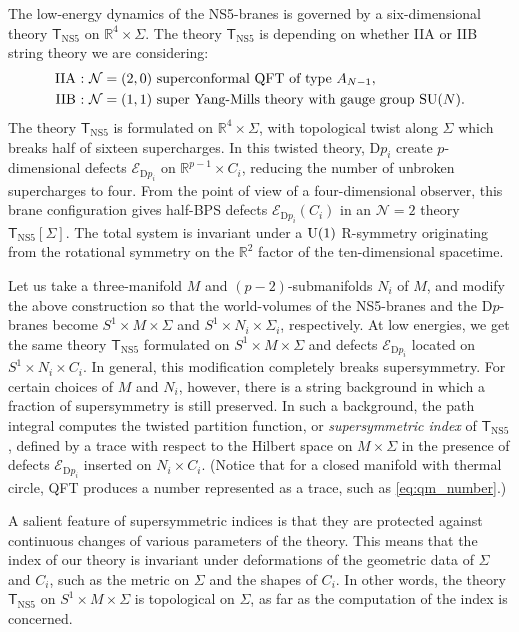 The low-energy dynamics of the NS5-branes is governed by a six-dimensional
theory $\mathsf{T}_{\mathrm{NS5}}$ on $\mathbb{R}^{4}\times\Sigma$.
The theory $\mathsf{T}_{\mathrm{NS5}}$ is depending on whether IIA
or IIB string theory we are considering:
\begin{align*}
  \textrm{IIA : }  &  \mathcal{N} = (2,0)  \text{ superconformal QFT of type } A_{N-1},  \\
  \textrm{IIB : }  &  \mathcal{N} = (1,1)  \text{ super Yang-Mills theory with gauge group } \mathrm{SU}(N).
\end{align*}
The theory $\mathsf{T}_{\mathrm{NS5}}$ is formulated on $\mathbb{R}^{4}\times\Sigma$,
with topological twist along $\Sigma$ which breaks half of sixteen
supercharges. In this twisted theory, D$p_{i}$ create $p$-dimensional
defects $\mathcal{E}_{\mathrm{D}p_{i}}$ on $\mathbb{R}^{p-1}\times C_{i}$,
reducing the number of unbroken supercharges to four. From the point
of view of a four-dimensional observer, this brane configuration gives
half-BPS defects $\mathcal{E}_{\mathrm{D}p_{i}}(C_{i})$
in an $\mathcal{N}=2$ theory $\mathsf{T}_{\mathrm{NS5}}[\Sigma]$.
The total system is invariant under a $\mathrm{U}(1)$ R-symmetry originating
from the rotational symmetry on the $\mathbb{R}^{2}$ factor of the
ten-dimensional spacetime.

Let us take a three-manifold $M$ and $(p-2)$-submanifolds $N_{i}$
of $M$, and modify the above construction so that the world-volumes
of the NS5-branes and the D$p$-branes become $S^{1}\times M\times\Sigma$
and $S^{1}\times N_{i}\times\Sigma_{i}$, respectively. At low energies,
we get the same theory $\mathsf{T}_{\mathrm{NS5}}$ formulated on
$S^{1}\times M\times\Sigma$ and defects $\mathcal{E}_{\mathrm{D}p_{i}}$
located on $S^{1}\times N_{i}\times C_{i}$. In general, this modification
completely breaks supersymmetry. For certain choices of $M$ and $N_{i}$,
however, there is a string background in which a fraction of supersymmetry
is still preserved. In such a background, the path integral computes
the twisted partition function, or \emph{supersymmetric index} of $\mathsf{T}_{\mathrm{NS5}}$,
defined by a trace with respect to the Hilbert space on $M\times\Sigma$ in the presence
of defects $\mathcal{E}_{\mathrm{D}p_{i}}$ inserted on $N_{i}\times C_{i}$.
(Notice that for a closed manifold with thermal circle, QFT produces a number represented as a trace,
such as \eqref{eq:qm_number}.)

A salient feature of supersymmetric indices is that they are protected
against continuous changes of various parameters of the theory. This
means that the index of our theory is invariant under deformations
of the geometric data of $\Sigma$ and $C_{i}$, such as the metric
on $\Sigma$ and the shapes of $C_{i}$. In other words, the theory
$\mathsf{T}_{\mathrm{NS5}}$ on $S^{1}\times M\times\Sigma$ is topological
on $\Sigma$, as far as the computation of the index is concerned.

